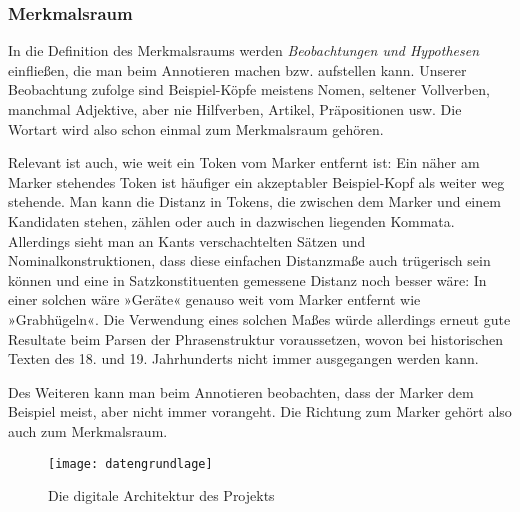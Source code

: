 \documentclass{article}
\begin{document}
\subsubsection{Merkmalsraum}

In die Definition des Merkmalsraums werden \emph{Beobachtungen und
  Hypothesen} einfließen, die man beim Annotieren machen
bzw. aufstellen kann. Unserer Beobachtung zufolge sind Beispiel-Köpfe
meistens Nomen, seltener Vollverben, manchmal Adjektive, aber nie
Hilfverben, Artikel, Präpositionen usw. Die Wortart wird also schon
einmal zum Merkmalsraum gehören.

Relevant ist auch, wie weit ein Token vom Marker entfernt ist: Ein
näher am Marker stehendes Token ist häufiger ein akzeptabler
Beispiel-Kopf als weiter weg stehende. Man kann die Distanz in Tokens,
die zwischen dem Marker und einem Kandidaten stehen, zählen oder auch
in dazwischen liegenden Kommata. Allerdings sieht man an Kants
verschachtelten Sätzen und Nominalkonstruktionen, dass diese einfachen
Distanzmaße auch trügerisch sein können und eine in Satzkonstituenten
gemessene Distanz noch besser wäre: In einer solchen wäre »Geräte«
genauso weit vom Marker entfernt wie »Grabhügeln«. Die Verwendung
eines solchen Maßes würde allerdings erneut gute Resultate beim Parsen
der Phrasenstruktur voraussetzen, wovon bei historischen Texten des
18. und 19. Jahrhunderts nicht immer ausgegangen werden kann.  

Des Weiteren kann man beim Annotieren beobachten, dass der Marker dem
Beispiel meist, aber nicht immer vorangeht. Die Richtung zum Marker
gehört also auch zum Merkmalsraum.

\begin{figure}[t]
  \ttfamily
  \texttt{[image: datengrundlage]}
  \caption{Die digitale Architektur des Projekts}
  \label{fig:Architektur}
\end{figure}

\afterpage{\clearpage}
\end{document}
